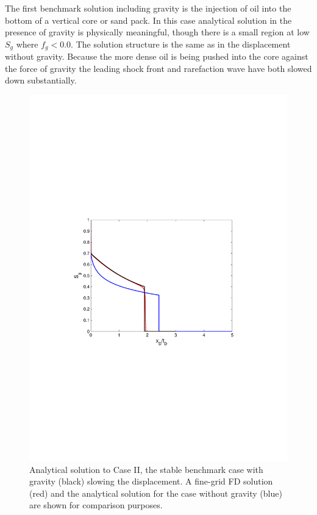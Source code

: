 The first benchmark solution including gravity is the injection of oil into the bottom of a vertical core or sand pack. In this case analytical solution in the presence of gravity is physically meaningful, though there is a small region at low $S_g$ where $f_g < 0.0$.  The solution structure is the same as in the displacement without gravity.  Because the more dense oil is being pushed into the core against the force of gravity the leading shock front and rarefaction wave have both slowed down substantially.


\begin{figure}[h]
\vspace{-1cm}
\centering
\includegraphics[width=15.0cm,height=20.cm]{./figures/BL_gravity_up}
\vspace{-5.5cm}
\caption{Analytical solution to Case II, the stable benchmark case with gravity (black) slowing the displacement.  A fine-grid FD solution (red) and the analytical solution for the case without gravity (blue) are shown for comparison purposes.} 
\label{fig:BL_grav_up}
\end{figure}

